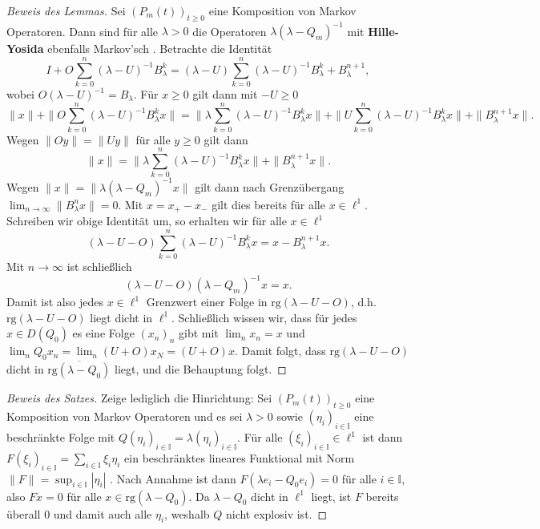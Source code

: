 \begin{proof}[Beweis des Lemmas]
  Sei $(P_m(t))_{t\geq0}$ eine Komposition von Markov Operatoren. Dann sind für alle $\lambda>0$ die Operatoren $\lambda (\lambda-Q_m)^{-1}$ mit \textbf{Hille-Yosida} ebenfalls Markov'sch . Betrachte die Identität
    $$I+O\sum_{k=0}^n(\lambda- U)^{-1}B_\lambda^k = (\lambda- U)\sum_{k=0}^n(\lambda-U)^{-1}B_\lambda^k + B_\lambda^{n+1},$$
  wobei $O(\lambda-U)^{-1}=B_\lambda$. Für  $x\geq0$ gilt dann mit $-U\geq0$ 
    $$\|x\|+\|O\sum_{k=0}^n(\lambda- U)^{-1}B_\lambda^kx\|=\|\lambda\sum_{k=0}^n(\lambda - U)^{-1}B_\lambda^kx\|+\|U\sum_{k=0}^n(\lambda-U)^{-1}B_\lambda^k x\|+\|B_\lambda^{n+1}x\|.$$ 
  Wegen $\|Oy\|=\|Uy\|$ für alle $y\geq0$ gilt dann 
    $$\|x\|=\|\lambda\sum_{k=0}^n (\lambda-U)^{-1}B_\lambda^k x\|+\|B_\lambda^{n+1}x\|.$$
  Wegen $\|x\|=\|\lambda(\lambda- Q_m)^{-1}x\|$  gilt dann nach Grenzübergang $\lim_{n\to\infty}\|B_\lambda^nx\|=0$. Mit $x=x_+-x_-$ gilt dies bereits für alle $x\in\ell^1$. Schreiben wir obige Identität um, so erhalten wir für alle $x\in\ell^1$ 
    $$(\lambda-U-O)\sum_{k=0}^n (\lambda-U)^{-1}B_\lambda^kx = x-B_\lambda^{n+1}x.$$
  Mit $n\to\infty$ ist schließlich 
    $$(\lambda-U-O)(\lambda-Q_m)^{-1}x=x.$$
  Damit ist also jedes $x\in\ell^1$ Grenzwert  einer Folge in $\text{rg}(\lambda-U-O)$, d.h. $\text{rg}(\lambda-U-O)$ liegt dicht in $\ell^1$. Schließlich wissen wir, dass für jedes $x\in D(Q_0)$ es eine Folge $(x_n)_n$ gibt mit $\lim_n x_n=x$ und $\lim_{n}Q_0x_n=\lim_{n}(U+O)x_N=(U+O)x$. Damit folgt, dass $\text{rg}(\lambda-U-O)$ dicht in $\overline{\text{rg}(\lambda-Q_0)}$ liegt, und die Behauptung folgt.
\end{proof}

\begin{proof}[Beweis des Satzes]
Zeige lediglich die Hinrichtung: Sei $(P_m(t))_{t\geq0}$ eine Komposition von Markov Operatoren und es sei  $\lambda >0$ sowie $(\eta_i)_{i\in\mathbb I}$ eine beschränkte Folge mit $Q(\eta_i)_{i\in\mathbb I}=\lambda(\eta_i)_{i\in\mathbb I}$. Für alle $(\xi_i)_{i\in\mathbb I}\in\ell^1$ ist dann $F(\xi_i)_{i\in\mathbb I} = \sum_{i\in\mathbb I}\xi_i\eta_i$ ein beschränktes lineares Funktional mit Norm $\|F\|=\sup_{i\in\mathbb I}|\eta_i|$ . Nach Annahme ist dann $F(\lambda e_i-Q_0e_i)=0$ für alle $i\in\mathbb I$, also $Fx=0$ für alle $x\in\text{rg}(\lambda-Q_0)$. Da $\lambda-Q_0$ dicht in $\ell^1$ liegt, ist $F$ bereits überall $0$ und damit auch alle $\eta_i$, weshalb $Q$ nicht explosiv ist.
\end{proof}



